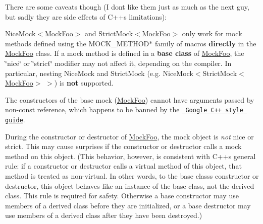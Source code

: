 There are some caveats though (I don\textquotesingle{}t like them just as much as the next guy, but sadly they are side effects of C++\textquotesingle{}s limitations)\+:


\begin{DoxyEnumerate}
\item {\ttfamily Nice\+Mock$<$\mbox{\hyperlink{class_mock_foo}{Mock\+Foo}}$>$} and {\ttfamily Strict\+Mock$<$\mbox{\hyperlink{class_mock_foo}{Mock\+Foo}}$>$} only work for mock methods defined using the {\ttfamily M\+O\+C\+K\+\_\+\+M\+E\+T\+H\+O\+D$\ast$} family of macros {\bfseries{directly}} in the {\ttfamily \mbox{\hyperlink{class_mock_foo}{Mock\+Foo}}} class. If a mock method is defined in a {\bfseries{base class}} of {\ttfamily \mbox{\hyperlink{class_mock_foo}{Mock\+Foo}}}, the \char`\"{}nice\char`\"{} or \char`\"{}strict\char`\"{} modifier may not affect it, depending on the compiler. In particular, nesting {\ttfamily Nice\+Mock} and {\ttfamily Strict\+Mock} (e.\+g. {\ttfamily Nice\+Mock$<$Strict\+Mock$<$\mbox{\hyperlink{class_mock_foo}{Mock\+Foo}}$>$ $>$}) is {\bfseries{not}} supported.
\end{DoxyEnumerate}
\begin{DoxyEnumerate}
\item The constructors of the base mock ({\ttfamily \mbox{\hyperlink{class_mock_foo}{Mock\+Foo}}}) cannot have arguments passed by non-\/const reference, which happens to be banned by the \href{https://google.github.io/styleguide/cppguide.html}{\texttt{ Google C++ style guide}}.
\end{DoxyEnumerate}
\begin{DoxyEnumerate}
\item During the constructor or destructor of {\ttfamily \mbox{\hyperlink{class_mock_foo}{Mock\+Foo}}}, the mock object is {\itshape not} nice or strict. This may cause surprises if the constructor or destructor calls a mock method on {\ttfamily this} object. (This behavior, however, is consistent with C++\textquotesingle{}s general rule\+: if a constructor or destructor calls a virtual method of {\ttfamily this} object, that method is treated as non-\/virtual. In other words, to the base class\textquotesingle{}s constructor or destructor, {\ttfamily this} object behaves like an instance of the base class, not the derived class. This rule is required for safety. Otherwise a base constructor may use members of a derived class before they are initialized, or a base destructor may use members of a derived class after they have been destroyed.)
\end{DoxyEnumerate}

